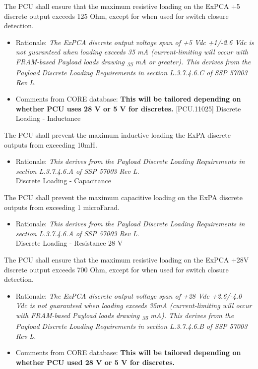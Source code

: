 The PCU shall ensure that the maximum resistive loading on the ExPCA +5 discrete output exceeds 125 Ohm, except for when used for switch closure detection.

\begin{itemize}
\item{} Rationale: \emph{The ExPCA discrete output voltage span of +5 Vdc +1\slash -2.6 Vdc is not guaranteed when loading exceeds 35 mA (current-limiting will occur with FRAM-based Payload loads drawing \textsubscript{35} mA or greater). This derives from the Payload Discrete Loading Requirements in section L.3.7.4.6.C of SSP 57003 Rev L.}

\item{} Comments from CORE database: \textbf{This will be tailored depending on whether PCU uses 28 V or 5 V for discretes.}
[PCU.11025] Discrete Loading - Inductance

\end{itemize}

The PCU shall prevent the maximum inductive loading the ExPA discrete outputs from exceeding 10mH.

\begin{itemize}
\item{} Rationale: \emph{This derives from the Payload Discrete Loading Requirements in section L.3.7.4.6.A of SSP 57003 Rev L.}\\
[PCU.11020] Discrete Loading - Capacitance

\end{itemize}

The PCU shall prevent the maximum capacitive loading on the ExPA discrete outputs from exceeding 1 microFarad.

\begin{itemize}
\item{} Rationale: \emph{This derives from the Payload Discrete Loading Requirements in section L.3.7.4.6.A of SSP 57003 Rev L.}\\
[PCU.11031] Discrete Loading - Resistance 28 V

\end{itemize}

The PCU shall ensure that the maximum resistive loading on the ExPCA +28V discrete output exceeds 700 Ohm, except for when used for switch closure detection.

\begin{itemize}
\item{} Rationale: \emph{The ExPCA discrete output voltage span of +28 Vdc +2.6\slash -4.0 Vdc is not guaranteed when loading exceeds 35mA (current-limiting will occur with FRAM-based Payload loads drawing \textsubscript{35} mA). This derives from the Payload Discrete Loading Requirements in section L.3.7.4.6.B of SSP 57003 Rev L.}

\item{} Comments from CORE database: \textbf{This will be tailored depending on whether PCU used 28 V or 5 V for discretes.}

\end{itemize}

